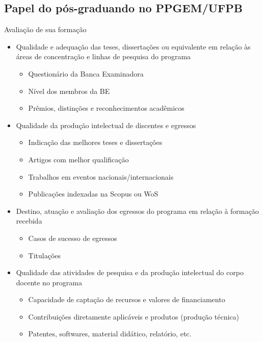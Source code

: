 \subsection*{Papel do pós-graduando no PPGEM/UFPB}

\begin{frame}{Avaliação de sua formação}
\begin{itemize}
\item Qualidade e adequação das teses, dissertações ou equivalente em relação às áreas de concentração e linhas de pesquisa do programa
\begin{itemize}
\item Questionário da Banca Examinadora
\item Nível dos membros da BE
\item Prêmios, distinções e reconhecimentos acadêmicos
\end{itemize}
\end{itemize}
\end{frame}

\begin{frame}
\begin{itemize}
\item Qualidade da produção intelectual de discentes e egressos
\begin{itemize}
\item Indicação das melhores teses e dissertações
\item Artigos com melhor qualificação
\item Trabalhos em eventos nacionais/internacionais
\item Publicações indexadas na Scopus ou WoS
\end{itemize}
\end{itemize}
\end{frame}

\begin{frame}
\begin{itemize}
\item Destino, atuação e avaliação dos egressos do programa em relação à formação recebida
\begin{itemize}
\item Casos de sucesso de egressos
\item Titulações
\end{itemize}
\end{itemize}
\end{frame}

\begin{frame}
\begin{itemize}
\item Qualidade das atividades de pesquisa e da produção intelectual do corpo docente no programa
\begin{itemize}
\item Capacidade de captação de recursos e valores de financiamento
\item Contribuições diretamente aplicáveis e produtos (produção técnica)
\item Patentes, softwares, material didático, relatório, etc.
\end{itemize}
\end{itemize}
\end{frame}


